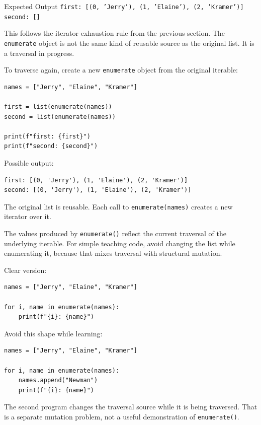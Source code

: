 \begin{iobox}{Expected Output}
\texttt{first: [(0, 'Jerry'), (1, 'Elaine'), (2, 'Kramer')]} \\
\texttt{second: []} \\
\end{iobox}


This follows the iterator exhaustion rule from the previous section. The \texttt{enumerate} object is not the same kind of reusable source as the original list. It is a traversal in progress.

To traverse again, create a new \texttt{enumerate} object from the original iterable:

\begin{verbatim}
names = ["Jerry", "Elaine", "Kramer"]

first = list(enumerate(names))
second = list(enumerate(names))

print(f"first: {first}")
print(f"second: {second}")
\end{verbatim}

Possible output:

\begin{verbatim}
first: [(0, 'Jerry'), (1, 'Elaine'), (2, 'Kramer')]
second: [(0, 'Jerry'), (1, 'Elaine'), (2, 'Kramer')]
\end{verbatim}

The original list is reusable. Each call to \texttt{enumerate(names)} creates a new iterator over it.

The values produced by \texttt{enumerate()} reflect the current traversal of the underlying iterable. For simple teaching code, avoid changing the list while enumerating it, because that mixes traversal with structural mutation.

Clear version:

\begin{verbatim}
names = ["Jerry", "Elaine", "Kramer"]

for i, name in enumerate(names):
    print(f"{i}: {name}")
\end{verbatim}

Avoid this shape while learning:

\begin{verbatim}
names = ["Jerry", "Elaine", "Kramer"]

for i, name in enumerate(names):
    names.append("Newman")
    print(f"{i}: {name}")
\end{verbatim}

The second program changes the traversal source while it is being traversed. That is a separate mutation problem, not a useful demonstration of \texttt{enumerate()}.

